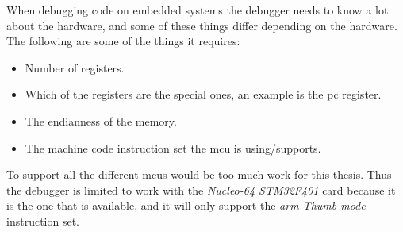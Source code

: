 When debugging code on embedded systems the debugger needs to know a lot about the hardware, and some of these things differ depending on the hardware.
The following are some of the things it requires:

\begin{itemize}
  \item Number of registers.
  \item Which of the registers are the special ones, an example is the \gls{pc} register.
  \item The endianness of the memory.
  \item The machine code instruction set the \gls{mcu} is using/supports.
\end{itemize}

To support all the different \glspl{mcu} would be too much work for this thesis.
Thus the debugger is limited to work with the \emph{Nucleo-64 STM32F401} card because it is the one that is available, and it will only support the \emph{arm Thumb mode} instruction set.






